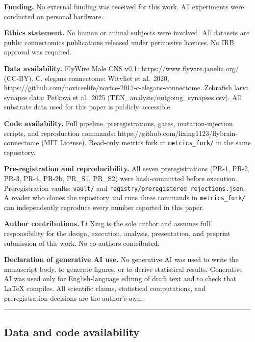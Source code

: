 \documentclass[
]{article}
\begin{document}
\textbf{Funding.} No external funding was received for this work. All
experiments were conducted on personal hardware.

\textbf{Ethics statement.} No human or animal subjects were involved.
All datasets are public connectomics publications released under
permissive licences. No IRB approval was required.

\textbf{Data availability.} FlyWire Male CNS v0.1:
https://www.flywire.janelia.org/ (CC-BY). C. elegans connectome:
Witvliet et al.~2020,
https://github.com/noviceelife/novice-2017-c-elegans-connectome.
Zebrafish larva synapse data: Petkova et al.~2025
(TEN\_analysis/outgoing\_synapses.csv). All substrate data used for this
paper is publicly accessible.

\textbf{Code availability.} Full pipeline, preregistrations, gates,
mutation-injection scripts, and reproduction commands:
https://github.com/lixing1123/flybrain-connectome (MIT License).
Read-only metrics fork at \texttt{metrics\_fork/} in the same
repository.

\textbf{Pre-registration and reproducibility.} All seven
preregistrations (PR-1, PR-2, PR-3, PR-4, PR-2b, PR\_S1, PR\_S2) were
hash-committed before execution. Preregistration vaults: \texttt{vault/}
and \texttt{registry/preregistered\_rejections.json}. A reader who
clones the repository and runs three commands in \texttt{metrics\_fork/}
can independently reproduce every number reported in this paper.

\textbf{Author contributions.} Li Xing is the sole author and assumes
full responsibility for the design, execution, analysis, presentation,
and preprint submission of this work. No co-authors contributed.

\textbf{Declaration of generative AI use.} No generative AI was used to
write the manuscript body, to generate figures, or to derive statistical
results. Generative AI was used only for English-language editing of
draft text and to check that LaTeX compiles. All scientific claims,
statistical computations, and preregistration decisions are the author's
own.

\begin{center}\rule{0.5\linewidth}{0.5pt}\end{center}

\subsection{Data and code
availability}\label{data-and-code-availability}
\end{document}
